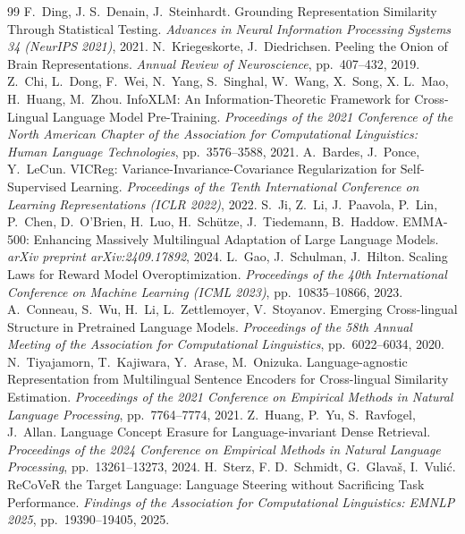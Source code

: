 \documentclass[11pt,a4paper]{article}
\begin{document}
\begin{thebibliography}{99}
F.~Ding, J. S.~Denain, J.~Steinhardt. Grounding Representation Similarity Through Statistical Testing. \emph{Advances in Neural Information Processing Systems 34 (NeurIPS 2021)}, 2021.
N.~Kriegeskorte, J.~Diedrichsen. Peeling the Onion of Brain Representations. \emph{Annual Review of Neuroscience}, pp.~407--432, 2019.
Z.~Chi, L.~Dong, F.~Wei, N.~Yang, S.~Singhal, W.~Wang, X.~Song, X. L.~Mao, H.~Huang, M.~Zhou. InfoXLM: An Information-Theoretic Framework for Cross-Lingual Language Model Pre-Training. \emph{Proceedings of the 2021 Conference of the North American Chapter of the Association for Computational Linguistics: Human Language Technologies}, pp.~3576--3588, 2021.
A.~Bardes, J.~Ponce, Y.~LeCun. VICReg: Variance-Invariance-Covariance Regularization for Self-Supervised Learning. \emph{Proceedings of the Tenth International Conference on Learning Representations (ICLR 2022)}, 2022.
S.~Ji, Z.~Li, J.~Paavola, P.~Lin, P.~Chen, D.~O'Brien, H.~Luo, H.~Sch\"utze, J.~Tiedemann, B.~Haddow. EMMA-500: Enhancing Massively Multilingual Adaptation of Large Language Models. \emph{arXiv preprint arXiv:2409.17892}, 2024.
L.~Gao, J.~Schulman, J.~Hilton. Scaling Laws for Reward Model Overoptimization. \emph{Proceedings of the 40th International Conference on Machine Learning (ICML 2023)}, pp.~10835--10866, 2023.
A.~Conneau, S.~Wu, H.~Li, L.~Zettlemoyer, V.~Stoyanov. Emerging Cross-lingual Structure in Pretrained Language Models. \emph{Proceedings of the 58th Annual Meeting of the Association for Computational Linguistics}, pp.~6022--6034, 2020.
N.~Tiyajamorn, T.~Kajiwara, Y.~Arase, M.~Onizuka. Language-agnostic Representation from Multilingual Sentence Encoders for Cross-lingual Similarity Estimation. \emph{Proceedings of the 2021 Conference on Empirical Methods in Natural Language Processing}, pp.~7764--7774, 2021.
Z.~Huang, P.~Yu, S.~Ravfogel, J.~Allan. Language Concept Erasure for Language-invariant Dense Retrieval. \emph{Proceedings of the 2024 Conference on Empirical Methods in Natural Language Processing}, pp.~13261--13273, 2024.
H.~Sterz, F. D.~Schmidt, G.~Glava\v{s}, I.~Vuli\'c. ReCoVeR the Target Language: Language Steering without Sacrificing Task Performance. \emph{Findings of the Association for Computational Linguistics: EMNLP 2025}, pp.~19390--19405, 2025.

\end{thebibliography}
\end{document}
